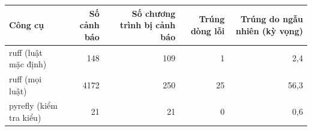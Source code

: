 \begin{tabular}{lrrrr}
\toprule
Công cụ & Số cảnh báo & Số chương trình bị cảnh báo & Trúng dòng lỗi & Trúng do ngẫu nhiên (kỳ vọng) \\
\midrule
ruff (luật mặc định) & 148 & 109 & 1 & 2,4 \\
ruff (mọi luật) & 4172 & 250 & 25 & 56,3 \\
pyrefly (kiểm tra kiểu) & 21 & 21 & 0 & 0,6 \\
\bottomrule
\end{tabular}
